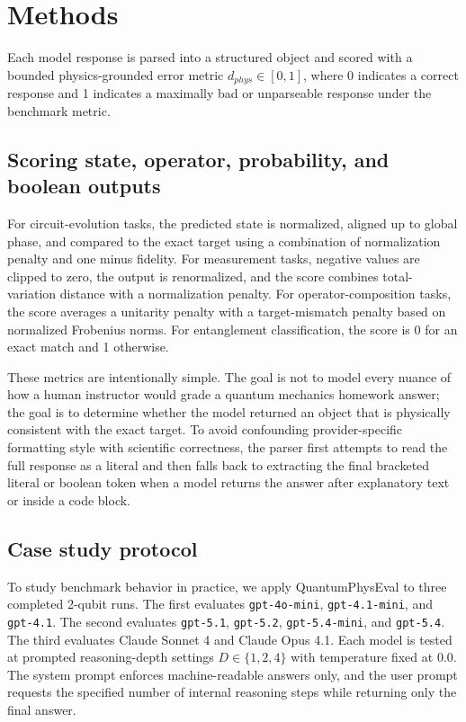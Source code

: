 \documentclass[11pt]{article}
\begin{document}
\section{Methods}
Each model response is parsed into a structured object and scored with a bounded physics-grounded error metric $d_{phys}\in[0,1]$, where 0 indicates a correct response and 1 indicates a maximally bad or unparseable response under the benchmark metric.

\subsection{Scoring state, operator, probability, and boolean outputs}
For circuit-evolution tasks, the predicted state is normalized, aligned up to global phase, and compared to the exact target using a combination of normalization penalty and one minus fidelity. For measurement tasks, negative values are clipped to zero, the output is renormalized, and the score combines total-variation distance with a normalization penalty. For operator-composition tasks, the score averages a unitarity penalty with a target-mismatch penalty based on normalized Frobenius norms. For entanglement classification, the score is 0 for an exact match and 1 otherwise.

These metrics are intentionally simple. The goal is not to model every nuance of how a human instructor would grade a quantum mechanics homework answer; the goal is to determine whether the model returned an object that is physically consistent with the exact target. To avoid confounding provider-specific formatting style with scientific correctness, the parser first attempts to read the full response as a literal and then falls back to extracting the final bracketed literal or boolean token when a model returns the answer after explanatory text or inside a code block.

\subsection{Case study protocol}
To study benchmark behavior in practice, we apply QuantumPhysEval to three completed 2-qubit runs. The first evaluates \texttt{gpt-4o-mini}, \texttt{gpt-4.1-mini}, and \texttt{gpt-4.1}. The second evaluates \texttt{gpt-5.1}, \texttt{gpt-5.2}, \texttt{gpt-5.4-mini}, and \texttt{gpt-5.4}. The third evaluates Claude Sonnet 4 and Claude Opus 4.1. Each model is tested at prompted reasoning-depth settings $D\in\{1,2,4\}$ with temperature fixed at 0.0. The system prompt enforces machine-readable answers only, and the user prompt requests the specified number of internal reasoning steps while returning only the final answer.
\end{document}
